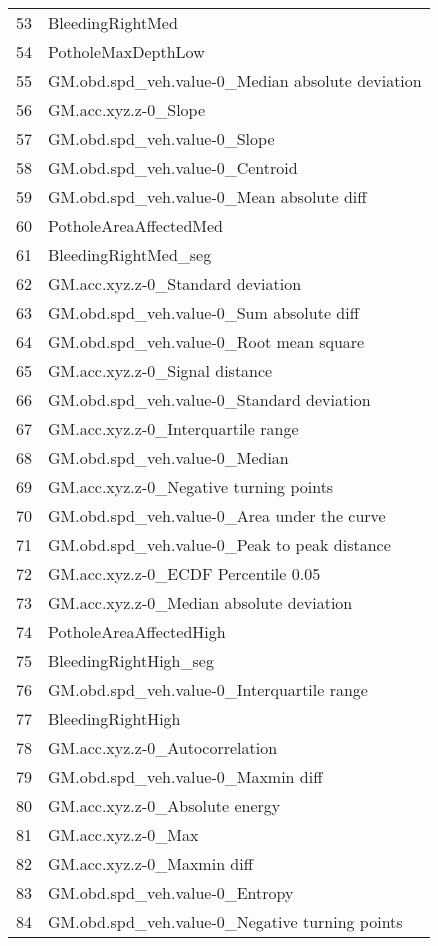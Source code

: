 \begin{tabular}{ll}
53 &                                  BleedingRightMed \\
54 &                                PotholeMaxDepthLow \\
55 &  GM.obd.spd\_veh.value-0\_Median absolute deviation \\
56 &                              GM.acc.xyz.z-0\_Slope \\
57 &                      GM.obd.spd\_veh.value-0\_Slope \\
58 &                   GM.obd.spd\_veh.value-0\_Centroid \\
59 &         GM.obd.spd\_veh.value-0\_Mean absolute diff \\
60 &                            PotholeAreaAffectedMed \\
61 &                              BleedingRightMed\_seg \\
62 &                 GM.acc.xyz.z-0\_Standard deviation \\
63 &          GM.obd.spd\_veh.value-0\_Sum absolute diff \\
64 &           GM.obd.spd\_veh.value-0\_Root mean square \\
65 &                    GM.acc.xyz.z-0\_Signal distance \\
66 &         GM.obd.spd\_veh.value-0\_Standard deviation \\
67 &                GM.acc.xyz.z-0\_Interquartile range \\
68 &                     GM.obd.spd\_veh.value-0\_Median \\
69 &            GM.acc.xyz.z-0\_Negative turning points \\
70 &       GM.obd.spd\_veh.value-0\_Area under the curve \\
71 &      GM.obd.spd\_veh.value-0\_Peak to peak distance \\
72 &               GM.acc.xyz.z-0\_ECDF Percentile 0.05 \\
73 &          GM.acc.xyz.z-0\_Median absolute deviation \\
74 &                           PotholeAreaAffectedHigh \\
75 &                             BleedingRightHigh\_seg \\
76 &        GM.obd.spd\_veh.value-0\_Interquartile range \\
77 &                                 BleedingRightHigh \\
78 &                    GM.acc.xyz.z-0\_Autocorrelation \\
79 &                GM.obd.spd\_veh.value-0\_Maxmin diff \\
80 &                    GM.acc.xyz.z-0\_Absolute energy \\
81 &                                GM.acc.xyz.z-0\_Max \\
82 &                        GM.acc.xyz.z-0\_Maxmin diff \\
83 &                    GM.obd.spd\_veh.value-0\_Entropy \\
84 &    GM.obd.spd\_veh.value-0\_Negative turning points \\
\bottomrule
\end{tabular}

